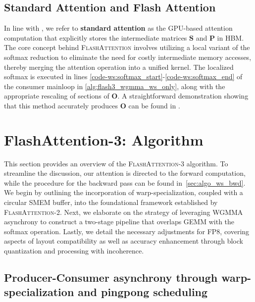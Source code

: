 \subsection{Standard Attention and Flash Attention} In line with \citet{dao2022flashattention}, we refer to \textbf{standard attention} as the GPU-based attention computation that explicitly stores the intermediate matrices $\mathbf{S}$ and $\mathbf{P}$ in HBM. The core concept behind \textsc{FlashAttention} involves utilizing a local variant of the softmax reduction to eliminate the need for costly intermediate memory accesses, thereby merging the attention operation into a unified kernel. The localized softmax is executed in lines \ref{code-ws:softmax_start}-\ref{code-ws:softmax_end} of the consumer mainloop in \cref{alg:flash3_wgmma_ws_only}, along with the appropriate rescaling of sections of $\mathbf{O}$. A straightforward demonstration showing that this method accurately produces $\mathbf{O}$ can be found in \cite[\S 2.3.1]{dao2023flashattention2}.

\section{FlashAttention-3: Algorithm}
\label{sec:algo}

This section provides an overview of the \textsc{FlashAttention-3} algorithm. To streamline the discussion, our attention is directed to the forward computation, while the procedure for the backward pass can be found in~\cref{sec:algo_ws_bwd}. We begin by outlining the incorporation of warp-specialization, coupled with a circular SMEM buffer, into the foundational framework established by \textsc{FlashAttention-2}. Next, we elaborate on the strategy of leveraging WGMMA asynchrony to construct a two-stage pipeline that overlaps GEMM with the softmax operation. Lastly, we detail the necessary adjustments for FP8, covering aspects of layout compatibility as well as accuracy enhancement through block quantization and processing with incoherence.

\subsection{Producer-Consumer asynchrony through warp-specialization and pingpong scheduling}
\label{sec:algo_ws}

